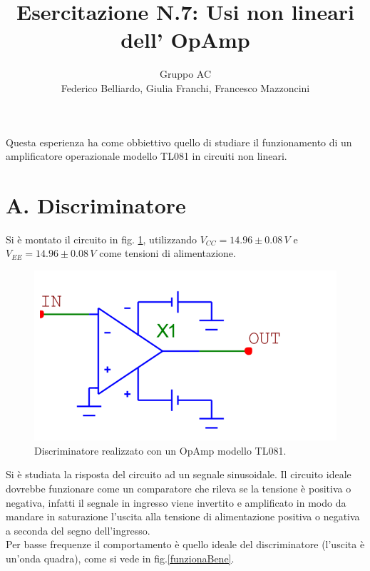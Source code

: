 \documentclass[10pt,a4paper]{article}
\author{Gruppo AC \\ Federico Belliardo, Giulia Franchi, Francesco Mazzoncini}
\title{Esercitazione N.7: Usi non lineari dell’ OpAmp}
\begin{document}
\maketitle
Questa esperienza ha come obbiettivo quello di studiare il funzionamento di un amplificatore operazionale modello TL081 in circuiti non lineari.

\section*{A. Discriminatore}

Si è montato il circuito in fig. \ref{circuito1}, utilizzando $V_{CC} = 14.96\pm0.08 \, V$ e $V_{EE} = 14.96 \pm 0.08 \, V$ come tensioni di alimentazione.

\begin{figure}[htb!]
\centering
\includegraphics[scale=0.5]{Discriminatore.png}
\caption{Discriminatore realizzato con un OpAmp modello TL081.}
\label{circuito1}
\end{figure}

Si è studiata la risposta del circuito ad un segnale sinusoidale. Il circuito ideale dovrebbe funzionare come un comparatore che rileva se la tensione è positiva o negativa, infatti il segnale in ingresso viene invertito e amplificato in modo da mandare in saturazione l'uscita alla tensione di alimentazione  positiva o negativa a seconda del segno dell'ingresso.\\
Per basse frequenze il comportamento è quello ideale del discriminatore (l'uscita è un'onda quadra), come si vede in fig.\ref{funzionaBene}.
\end{document}
